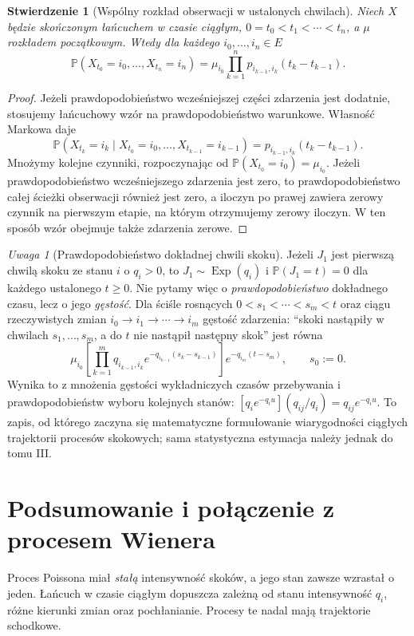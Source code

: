 \documentclass[11pt,a4paper,oneside]{report}
\numberwithin{equation}{chapter}
\theoremstyle{plain}
\newtheorem{stwierdzenie}[twierdzenie]{Stwierdzenie}
\theoremstyle{definition}
\theoremstyle{remark}
\newtheorem{uwaga}{Uwaga}[chapter]
\newcommand{\Prob}{\mathbb{P}}
\begin{document}
\begin{stwierdzenie}[Wspólny rozkład obserwacji w ustalonych chwilach]
Niech $X$ będzie skończonym łańcuchem w czasie ciągłym,
$0=t_0<t_1<\cdots<t_n$, a $\mu$ rozkładem początkowym.
Wtedy dla każdego $i_0,\ldots,i_n\in E$
\[
\Prob(X_{t_0}=i_0,\ldots,X_{t_n}=i_n)
=\mu_{i_0}\prod_{k=1}^n
 p_{i_{k-1},i_k}(t_k-t_{k-1}).
\]
\end{stwierdzenie}
\begin{proof}
Jeżeli prawdopodobieństwo wcześniejszej części zdarzenia
jest dodatnie, stosujemy łańcuchowy wzór na prawdopodobieństwo
warunkowe. Własność Markowa daje
\[
\Prob(X_{t_k}=i_k\mid X_{t_0}=i_0,\ldots,X_{t_{k-1}}=i_{k-1})
=p_{i_{k-1},i_k}(t_k-t_{k-1}).
\]
Mnożymy kolejne czynniki, rozpoczynając od
$\Prob(X_{t_0}=i_0)=\mu_{i_0}$.
Jeżeli prawdopodobieństwo wcześniejszego zdarzenia jest zero,
to prawdopodobieństwo całej ścieżki obserwacji również
jest zero, a iloczyn po prawej zawiera zerowy czynnik
na pierwszym etapie, na którym otrzymujemy zerowy iloczyn.
W ten sposób wzór obejmuje także zdarzenia zerowe.
\end{proof}

\begin{uwaga}[Prawdopodobieństwo dokładnej chwili skoku]
Jeżeli $J_1$ jest pierwszą chwilą skoku ze stanu $i$ o
$q_i>0$, to $J_1\sim\operatorname{Exp}(q_i)$ i
$\Prob(J_1=t)=0$ dla każdego ustalonego $t\ge0$.
Nie pytamy więc o \emph{prawdopodobieństwo} dokładnego czasu,
lecz o jego \emph{gęstość}. Dla ściśle rosnących
$0<s_1<\cdots<s_m<t$ oraz ciągu rzeczywistych zmian
$i_0\to i_1\to\cdots\to i_m$ gęstość zdarzenia:
``skoki nastąpiły w chwilach $s_1,\ldots,s_m$,
a do $t$ nie nastąpił następny skok'' jest równa
\[
\mu_{i_0}\left[\prod_{k=1}^m
q_{i_{k-1},i_k}e^{-q_{i_{k-1}}(s_k-s_{k-1})}\right]
e^{-q_{i_m}(t-s_m)},\qquad s_0:=0.
\]
Wynika to z mnożenia gęstości wykładniczych czasów
przebywania i prawdopodobieństw wyboru kolejnych stanów:
$[q_i e^{-q_i u}](q_{ij}/q_i)=q_{ij}e^{-q_i u}$.
To zapis, od którego zaczyna się matematyczne formułowanie
wiarygodności ciągłych trajektorii procesów skokowych;
sama statystyczna estymacja należy jednak do tomu III.
\end{uwaga}

\section{Podsumowanie i połączenie z procesem Wienera}
Proces Poissona miał \emph{stałą} intensywność skoków,
a jego stan zawsze wzrastał o jeden. Łańcuch w czasie
ciągłym dopuszcza zależną od stanu intensywność $q_i$,
różne kierunki zmian oraz pochłanianie. Procesy te nadal
mają trajektorie schodkowe.
\end{document}
